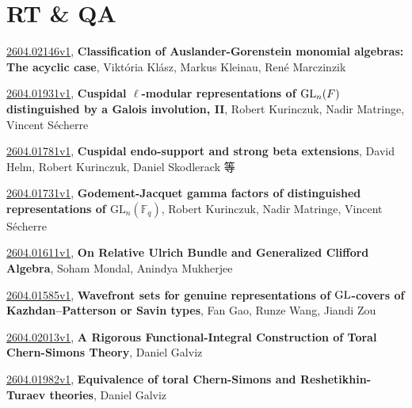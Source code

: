 \documentclass[9pt, a4paper]{article}
\theoremstyle{plain}
\theoremstyle{definition}
\theoremstyle{remark}
\newcommand{\arxiv}[3]{\href{https://arxiv.org/abs/#1}{#1}, \textbf{\textcolor{arxivblue}{#2}}, #3}
\begin{document}

\section{RT \& QA}
\arxiv{2604.02146v1}{Classification of Auslander-Gorenstein monomial algebras: The acyclic case}{Viktória Klász, Markus Kleinau, René Marczinzik}

\arxiv{2604.01931v1}{Cuspidal $\ell$-modular representations of ${\rm GL}_n(F)$ distinguished by a Galois involution, II}{Robert Kurinczuk, Nadir Matringe, Vincent Sécherre}

\arxiv{2604.01781v1}{Cuspidal endo-support and strong beta extensions}{David Helm, Robert Kurinczuk, Daniel Skodlerack 等}

\arxiv{2604.01731v1}{Godement-Jacquet gamma factors of distinguished representations of $\mathrm{GL}_n(\mathbb{F}_q)$}{Robert Kurinczuk, Nadir Matringe, Vincent Sécherre}

\arxiv{2604.01611v1}{On Relative Ulrich Bundle and Generalized Clifford Algebra}{Soham Mondal, Anindya Mukherjee}

\arxiv{2604.01585v1}{Wavefront sets for genuine representations of $\rm GL$-covers of Kazhdan--Patterson or Savin types}{Fan Gao, Runze Wang, Jiandi Zou}

\arxiv{2604.02013v1}{A Rigorous Functional-Integral Construction of Toral Chern-Simons Theory}{Daniel Galviz}

\arxiv{2604.01982v1}{Equivalence of toral Chern-Simons and Reshetikhin-Turaev theories}{Daniel Galviz}

\end{document}
